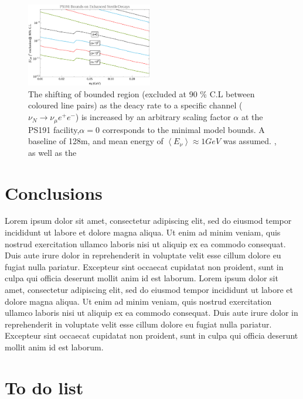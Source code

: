 \documentclass[11pt, a4paper]{article}
\newcommand{\lorem}{ \textcolor[rgb]{0.8,0.8,0.8}{Lorem ipsum dolor sit amet, consectetur
adipiscing elit, sed do eiusmod tempor incididunt ut labore et dolore magna
aliqua. Ut enim ad minim veniam, quis nostrud exercitation ullamco laboris nisi
ut aliquip ex ea commodo consequat. Duis aute irure dolor in reprehenderit in
voluptate velit esse cillum dolore eu fugiat nulla pariatur. Excepteur sint
occaecat cupidatat non proident, sunt in culpa qui officia deserunt mollit anim
id est laborum.}}
\begin{document}
 
\begin{figure}[t]
\centering
\includegraphics[width=0.49\textwidth]{figures/ps191_enhanced.pdf} \caption{\label{fig:ps191_enhance}The shifting of bounded region (excluded at 90 \% C.L  between coloured line pairs) as the deacy rate to a specific channel ($\nu_N \rightarrow \nu_\mu e^+e^-$) is increased by an arbitrary scaling factor $\alpha$ at the PS191 facility,$\alpha = 0$ corresponds to the minimal model bounds. A baseline of 128m, and mean energy of $\left< E_\nu \right> \approx 1 GeV$ was assumed.
, as well as the }
\end{figure}

\section{Conclusions}
\lorem\lorem


\newpage 

\section{To do list}
\end{document}
